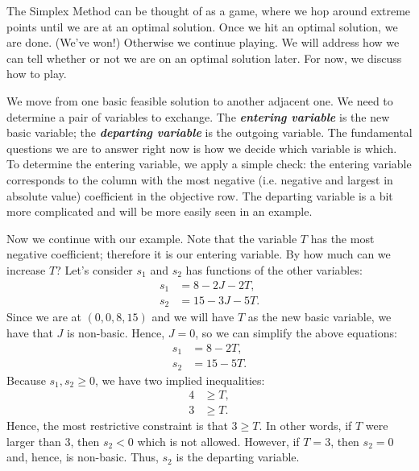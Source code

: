 \documentclass[a4paper, 12pt]{article}
\numberwithin{equation}{section}
\numberwithin{figure}{section}
\theoremstyle{definition}
\renewcommand{\geq}{\geqslant}
\newcommand{\define}[1]{\textbf{\textit{#1}}}
\begin{document}
The Simplex Method can be thought of as a game, where we hop around extreme
points until we are at an optimal solution. Once we hit an optimal solution, we
are done. (We've won!) Otherwise we continue playing. We will address how we can
tell whether or not we are on an optimal solution later. For now, we discuss how
to play.

We move from one basic feasible solution to another adjacent one. We need to
determine a pair of variables to exchange. The \define{entering variable} is the
new basic variable; the \define{departing variable} is the outgoing variable.
The fundamental questions we are to answer right now is how we decide which
variable is which. To determine the entering variable, we apply a simple check:
the entering variable corresponds to the column with the most negative (i.e.
negative and largest in absolute value) coefficient in the objective row. The
departing variable is a bit more complicated and will be more easily seen in an
example.

Now we continue with our example. Note that the variable $T$ has the most
negative coefficient; therefore it is our entering variable. By how much can we
increase $T$? Let's consider $s_1$ and $s_2$ has functions of the other
variables:
\begin{align*}
	s_1 &= 8 - 2J - 2T, \\
	s_2 &= 15 - 3J - 5T. 
\end{align*}
Since we are at $(0,0,8,15)$ and we will have $T$ as the new basic variable, we
have that $J$ is non-basic. Hence, $J=0$, so we can simplify the above
equations:
\begin{align*}
	s_1 &= 8 - 2T, \\
	s_2 &= 15 - 5T. 
\end{align*}
Because $s_1,s_2\geq 0$, we have two implied inequalities:
\begin{equation}\label{eqn:theta-ratios}
	\begin{split}
		4 &\geq T, \\
		3 &\geq T. 	
	\end{split}
\end{equation}
Hence, the most restrictive constraint is that $3\geq T$. In other words, if $T$
were larger than $3$, then $s_2<0$ which is not allowed. However, if $T=3$, then
$s_2=0$ and, hence, is non-basic. Thus, $s_2$ is the departing variable.
\end{document}

